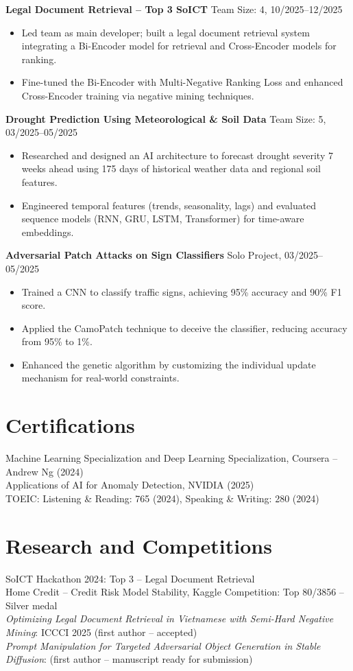 \documentclass[11pt,a4paper]{article}
\begin{document}
\textbf{Legal Document Retrieval -- Top 3 SoICT} \hfill Team Size: 4, 10/2025--12/2025\\
\begin{itemize}[left=0pt]
  \item Led team as main developer; built a legal document retrieval system integrating a Bi-Encoder model for retrieval and Cross-Encoder models for ranking.
  \item Fine-tuned the Bi-Encoder with Multi-Negative Ranking Loss and enhanced Cross-Encoder training via negative mining techniques.
\end{itemize}

\textbf{Drought Prediction Using Meteorological \& Soil Data} \hfill Team Size: 5, 03/2025--05/2025\\
\begin{itemize}[left=0pt]
  \item Researched and designed an AI architecture to forecast drought severity 7 weeks ahead using 175 days of historical weather data and regional soil features.
  \item Engineered temporal features (trends, seasonality, lags) and evaluated sequence models (RNN, GRU, LSTM, Transformer) for time-aware embeddings.
\end{itemize}

\textbf{Adversarial Patch Attacks on Sign Classifiers} \hfill Solo Project, 03/2025--05/2025\\
\begin{itemize}[left=0pt]
  \item Trained a CNN to classify traffic signs, achieving 95\% accuracy and 90\% F1 score.
  \item Applied the CamoPatch technique to deceive the classifier, reducing accuracy from 95\% to 1\%.
  \item Enhanced the genetic algorithm by customizing the individual update mechanism for real-world constraints.
\end{itemize}

\section*{Certifications}
Machine Learning Specialization and Deep Learning Specialization, Coursera -- Andrew Ng (2024)\\
Applications of AI for Anomaly Detection, NVIDIA (2025)\\
TOEIC: Listening \& Reading: 765 (2024), Speaking \& Writing: 280 (2024)

\section*{Research and Competitions}
SoICT Hackathon 2024: Top 3 -- Legal Document Retrieval\\
Home Credit -- Credit Risk Model Stability, Kaggle Competition: Top 80/3856 -- Silver medal\\
\textit{Optimizing Legal Document Retrieval in Vietnamese with Semi-Hard Negative Mining}: ICCCI 2025 (first author -- accepted)\\
\textit{Prompt Manipulation for Targeted Adversarial Object Generation in Stable Diffusion}: (first author -- manuscript ready for submission)
\end{document}
